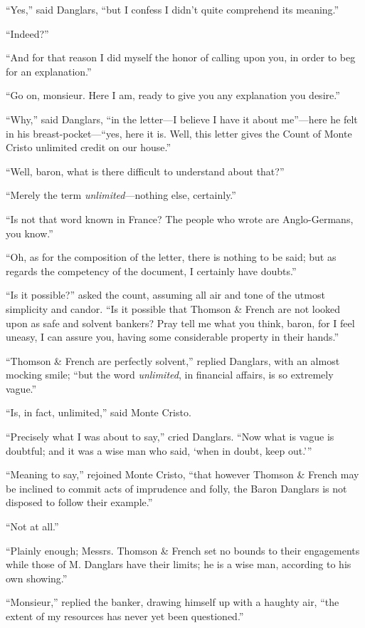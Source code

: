 “Yes,” said Danglars, “but I confess I didn’t quite comprehend its
meaning.”

“Indeed?”

“And for that reason I did myself the honor of calling upon you, in
order to beg for an explanation.”

“Go on, monsieur. Here I am, ready to give you any explanation you
desire.”

“Why,” said Danglars, “in the letter—I believe I have it about me”—here
he felt in his breast-pocket—“yes, here it is. Well, this letter gives
the Count of Monte Cristo unlimited credit on our house.”

“Well, baron, what is there difficult to understand about that?”

“Merely the term \textit{unlimited}—nothing else, certainly.”

“Is not that word known in France? The people who wrote are
Anglo-Germans, you know.”

“Oh, as for the composition of the letter, there is nothing to be said;
but as regards the competency of the document, I certainly have
doubts.”

“Is it possible?” asked the count, assuming all air and tone of the
utmost simplicity and candor. “Is it possible that Thomson \& French are
not looked upon as safe and solvent bankers? Pray tell me what you
think, baron, for I feel uneasy, I can assure you, having some
considerable property in their hands.”

“Thomson \& French are perfectly solvent,” replied Danglars, with an
almost mocking smile; “but the word \textit{unlimited}, in financial affairs,
is so extremely vague.”

“Is, in fact, unlimited,” said Monte Cristo.

“Precisely what I was about to say,” cried Danglars. “Now what is vague
is doubtful; and it was a wise man who said, ‘when in doubt, keep
out.’”

“Meaning to say,” rejoined Monte Cristo, “that however Thomson \& French
may be inclined to commit acts of imprudence and folly, the Baron
Danglars is not disposed to follow their example.”

“Not at all.”

“Plainly enough; Messrs. Thomson \& French set no bounds to their
engagements while those of M. Danglars have their limits; he is a wise
man, according to his own showing.”

“Monsieur,” replied the banker, drawing himself up with a haughty air,
“the extent of my resources has never yet been questioned.”

